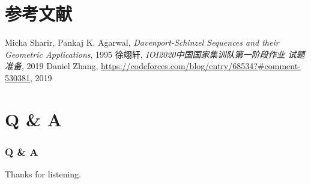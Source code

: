 \documentclass[mathserif]{ctexbeamer}
\begin{document}
\section{参考文献}
\begin{thebibliography}{widest label}
 Micha Sharir, Pankaj K. Agarwal, \emph{Davenport-Schinzel Sequences and their Geometric Applications}, 1995
 徐翊轩, \emph{IOI2020中国国家集训队第一阶段作业 试题准备}, 2019
 Daniel Zhang, \url{https://codeforces.com/blog/entry/68534?#comment-530381}, 2019
\end{thebibliography}

\section{Q \& A}

\frame
{
  \frametitle{Q \& A}
  
  Thanks for listening.
}
\end{document}
